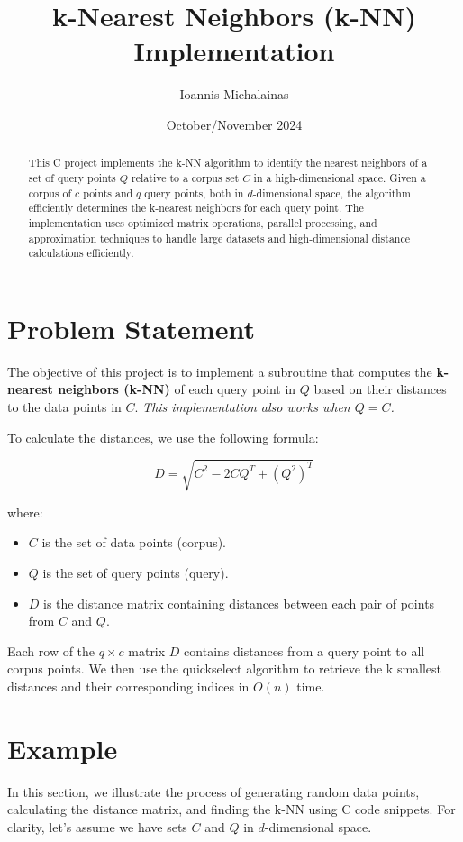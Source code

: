 \documentclass{article}
\title{\textbf{k-Nearest Neighbors (k-NN) Implementation}}
\author{Ioannis Michalainas}
\date{October/November 2024}
\begin{document}
\maketitle

\begin{abstract}
This C project implements the k-NN algorithm to identify the nearest neighbors of a set of query points \( Q \) relative to a corpus set \( C \) in a high-dimensional space. 
Given a corpus of \( c \) points and \( q \) query points, both in \( d \)-dimensional space, the algorithm efficiently determines the k-nearest neighbors for each query point. 
The implementation uses optimized matrix operations, parallel processing, and approximation techniques to handle large datasets and high-dimensional distance calculations efficiently.
\end{abstract}

\section{Problem Statement}
The objective of this project is to implement a subroutine that computes the \textbf{k-nearest neighbors (k-NN)} of each query point in \( Q \) based on their distances to the data points in \( C \). \textit{This implementation also works when  \(Q=C\).}

To calculate the distances, we use the following formula:

\begin{equation}
    D = \sqrt{C^2 - 2 C Q^T + (Q^2)^T}
\end{equation}

where:
\begin{itemize}
    \item \( C \) is the set of data points (corpus).
    \item \( Q \) is the set of query points (query).
    \item \( D \) is the distance matrix containing distances between each pair of points from \( C \) and \( Q \).
\end{itemize}

Each row of the \( q\times c \) matrix \( D \) contains distances from a query point to all corpus points. We then use the quickselect algorithm to retrieve the k smallest distances and their corresponding indices in \( O(n) \) time. 

\section{Example}
In this section, we illustrate the process of generating random data points, calculating the distance matrix, and finding the k-NN using C code snippets. For clarity, let's assume we have sets \( C \) and \( Q \) in \( d \)-dimensional space.
\end{document}
